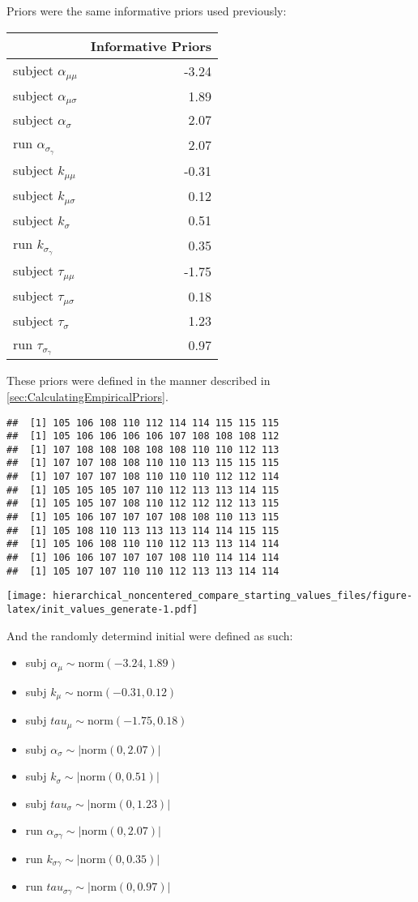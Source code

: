 \documentclass[]{article}
\providecommand{\tightlist}{%
  \setlength{\itemsep}{0pt}\setlength{\parskip}{0pt}}
\begin{document}
Priors were the same informative priors used previously:

\begin{longtable}[]{@{}lr@{}}
\toprule
& Informative Priors\tabularnewline
\midrule
\endhead
subject \(\alpha_{\mu\mu}\) & -3.24\tabularnewline
subject \(\alpha_{\mu\sigma}\) & 1.89\tabularnewline
subject \(\alpha_{\sigma}\) & 2.07\tabularnewline
run \(\alpha_{\sigma_{\gamma}}\) & 2.07\tabularnewline
subject \(k_{\mu\mu}\) & -0.31\tabularnewline
subject \(k_{\mu\sigma}\) & 0.12\tabularnewline
subject \(k_{\sigma}\) & 0.51\tabularnewline
run \(k_{\sigma_{\gamma}}\) & 0.35\tabularnewline
subject \(\tau_{\mu\mu}\) & -1.75\tabularnewline
subject \(\tau_{\mu\sigma}\) & 0.18\tabularnewline
subject \(\tau_{\sigma}\) & 1.23\tabularnewline
run \(\tau_{\sigma_{\gamma}}\) & 0.97\tabularnewline
\bottomrule
\end{longtable}

These priors were defined in the manner described in
\ref{sec:CalculatingEmpiricalPriors}.

\begin{verbatim}
##  [1] 105 106 108 110 112 114 114 115 115 115
##  [1] 105 106 106 106 106 107 108 108 108 112
##  [1] 107 108 108 108 108 108 110 110 112 113
##  [1] 107 107 108 108 110 110 113 115 115 115
##  [1] 107 107 107 108 110 110 110 112 112 114
##  [1] 105 105 105 107 110 112 113 113 114 115
##  [1] 105 105 107 108 110 112 112 112 113 115
##  [1] 105 106 107 107 107 108 108 110 113 115
##  [1] 105 108 110 113 113 113 114 114 115 115
##  [1] 105 106 108 110 110 112 113 113 114 114
##  [1] 106 106 107 107 107 108 110 114 114 114
##  [1] 105 107 107 110 110 112 113 113 114 114
\end{verbatim}

\texttt{[image: hierarchical\_noncentered\_compare\_starting\_values\_files/figure-latex/init\_values\_generate-1.pdf]}

And the randomly determind initial were defined as such:

\begin{itemize}
\tightlist
\item
  subj \(\alpha_{\mu} \sim \mathrm{norm}(-3.24,1.89)\)
\item
  subj \(k_{\mu} \sim \mathrm{norm}(-0.31,0.12)\)
\item
  subj \(tau_{\mu} \sim \mathrm{norm}(-1.75,0.18)\)
\item
  subj \(\alpha_{\sigma} \sim |\mathrm{norm}(0,2.07)|\)
\item
  subj \(k_{\sigma} \sim |\mathrm{norm}(0,0.51)|\)
\item
  subj \(tau_{\sigma} \sim |\mathrm{norm}(0,1.23)|\)
\item
  run \(\alpha_{\sigma\gamma} \sim |\mathrm{norm}(0,2.07)|\)
\item
  run \(k_{\sigma\gamma} \sim |\mathrm{norm}(0,0.35)|\)
\item
  run \(tau_{\sigma\gamma} \sim |\mathrm{norm}(0,0.97)|\)
\end{itemize}
\end{document}
